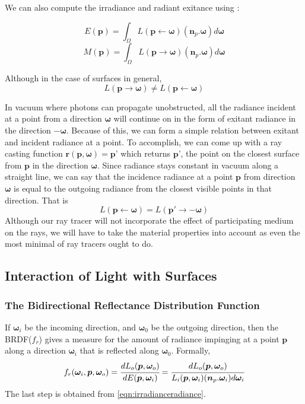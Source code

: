 \documentclass[a4paper, 12pt]{article}
\begin{document}
We can also compute the irradiance and radiant exitance 
using :

\begin{equation}\label{eqn:irradianceradiance}
	E(\bm{p}) = \int_{\Omega}L(\bm{p}\leftarrow \bm{\omega})(\bm{n}_{p}.\bm{\omega})d\bm{\omega} 
\end{equation}
\begin{equation}
	M(\bm{p}) = \int_{\Omega}L(\bm{p}\to \bm{\omega})(\bm{n}_{p}.\bm{\omega})d\bm{\omega} 
\end{equation}

Although in the case of surfaces in general, 
$$
L(\bm{p}\to \bm{\omega}) \neq L(\bm{p}\leftarrow \bm{\omega}) 
$$

In vacuum where photons can propagate unobstructed, all the radiance incident at a 
point from a direction $\bm{\omega}$ will continue on in the form of 
exitant radiance in the direction $-\bm{\omega}$. Because of this, we can form a simple 
relation between exitant and incident radiance at a point. To accomplish, 
we can come up with a ray casting function $\bm{r(\bm{p}, \bm{\omega})} = \bm{p}$'
which returns $\bm{p}$', the point on the closest surface from $\bm{p}$ in the
direction $\bm{\omega}$. Since radiance stays constant in vacuum along a 
straight line, we can say that the incidence radiance at a point $\bm{p}$ from 
direction $\bm{\omega}$ is equal to the outgoing radiance from the closest visible points 
in that direction. That is 
\begin{equation}\label{eqn:inputoutputinvariance}
L(\bm{p}\leftarrow \bm{\omega}) = L(\bm{p}' \to -\bm{\omega})
\end{equation}
Although our ray tracer will not incorporate the effect of participating 
medium on the rays, we will have to take the material properties into 
account as even the most minimal of ray tracers ought to do.

\subsection{Interaction of Light with Surfaces}
\subsubsection{The Bidirectional Reflectance Distribution Function}
If $\bm{\omega}_{i}$ be the incoming direction, and $\bm{\omega}_{0}$ be the outgoing direction, then 
the BRDF($f_{r}$) gives a measure for the amount of radiance impinging at a point $\bm{p}$ along 
a direction $\bm{\omega}_{i}$ that is reflected along $\bm{\omega}_{0}$. Formally, 
\begin{equation}\label{eqn:brdf}
	f_{r}(\bm{\omega}_{i}, \bm{p}, \bm{\omega}_{o}) = \cfrac{dL_{o}(\bm{p}, \bm{\omega}_{o})}{dE(\bm{p},\bm{\omega}_{i})}
	= \cfrac{dL_{o}(\bm{p}, \bm{\omega}_{o})}{L_{i}(\bm{p}, \bm{\omega}_{i})(\bm{n}_{p}.\bm{\omega}_{i})d\bm{\omega}_{i}}
\end{equation}
The last step is obtained from \eqref{eqn:irradianceradiance}.
\end{document}

